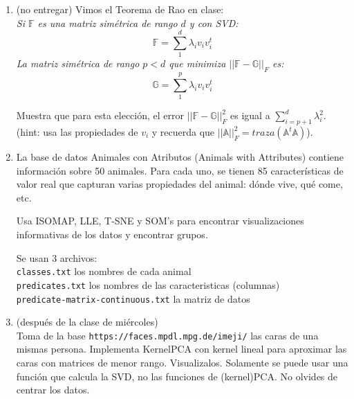 \documentclass[12pt]{book}
\newcommand {\?}{?`}
\newcommand{\A}{\mathbb{A}}
\newcommand{\F}{\mathbb{F}}
\newcommand{\G}{\mathbb{G}}
\begin{document}
\begin{enumerate}
\item (no entregar)
Vimos el Teorema de Rao en clase: \\
{\it Si $\F$ es una matriz sim\'etrica de rango $d$ y con SVD:
\[\F=\sum_1^d \lambda_i v_i v_i^t  \]
La matriz sim\'etrica de rango $p<d$ que minimiza $||\F-\G||_F$ es:
\[\G=\sum_1^p \lambda_i v_i v_i^t  \]}

Muestra que para esta elecci\'on,  el error $||\F-\G||_F^2$ es igual a $\sum_{i=p+1}^d \lambda_i^2$. \\
(hint: usa las propiedades de $v_i$ y recuerda que $||\A||^2_F=traza(\A^t\A)$).



\item

La base de datos Animales con Atributos (Animals with Attributes) contiene informaci\'on
sobre 50 animales. Para cada uno, se tienen 85 caracter\'isticas de valor real que capturan varias
propiedades del animal: d\'onde vive, qu\'e come, etc. 

Usa ISOMAP, LLE, T-SNE y SOM’s para encontrar visualizaciones informativas de los datos  y encontrar grupos.

Se usan 3 archivos: \\ {\tt classes.txt} los nombres de cada animal \\
{\tt predicates.txt} los nombres de las caracteristicas (columnas) \\
{\tt predicate-matrix-continuous.txt} la matriz de datos 

\item
(despu\'es de la clase de mi\'ercoles)\\
Toma de la base {\tt https://faces.mpdl.mpg.de/imeji/}   las caras de una mismas persona. Implementa  KernelPCA con kernel lineal para aproximar las caras con matrices de menor rango. Visualizalos. Solamente se puede usar una funci\'on que calcula la SVD, no las funciones de (kernel)PCA. No olvides de centrar los datos.

\end{enumerate}  
\end{document}
